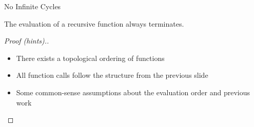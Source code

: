 \documentclass{beamer}
\begin{document}
\begin{frame}{No Infinite Cycles}
  \begin{theorem}
    The \alert{evaluation} of a recursive function always \alert{terminates}.
  \end{theorem}
  \pause
  \begin{proof}[Proof (hints).]
    \begin{itemize}
      \item There exists a \alert{topological ordering} of functions
      \item All function calls follow the \alert{structure} from the previous
            slide
      \item Some common-sense assumptions about the \alert{evaluation order} and
            previous work
    \end{itemize}
  \end{proof}
\end{frame}
\end{document}
